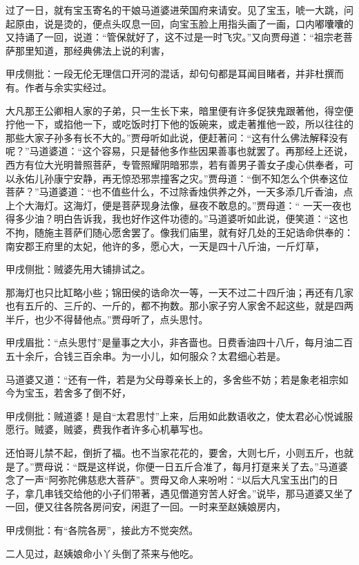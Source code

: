 \begin{parag}
    过了一日，就有宝玉寄名的干娘马道婆进荣国府来请安。见了宝玉，唬一大跳，问起原由，说是烫的，便点头叹息一回，向宝玉脸上用指头画了一画，口内嘟囔囔的又持诵了一回，说道：“管保就好了，这不过是一时飞灾。”又向贾母道：“祖宗老菩萨那里知道，那经典佛法上说的利害，\begin{note}甲戌侧批：一段无伦无理信口开河的混话，却句句都是耳闻目睹者，并非杜撰而有。作者与余实实经过。\end{note}大凡那王公卿相人家的子弟，只一生长下来，暗里便有许多促狭鬼跟著他，得空便拧他一下，或掐他一下，或吃饭时打下他的饭碗来，或走著推他一跤，所以往往的那些大家子孙多有长不大的。”贾母听如此说，便赶著问：“这有什么佛法解释没有呢？”马道婆道：“这个容易，只是替他多作些因果善事也就罢了。再那经上还说，西方有位大光明普照菩萨，专管照耀阴暗邪祟，若有善男子善女子虔心供奉者，可以永佑儿孙康宁安静，再无惊恐邪祟撞客之灾。”贾母道：“倒不知怎么个供奉这位菩萨？”马道婆道：“也不值些什么，不过除香烛供养之外，一天多添几斤香油，点上个大海灯。这海灯，便是菩萨现身法像，昼夜不敢息的。”贾母道：“ 一天一夜也得多少油？明白告诉我，我也好作这件功德的。”马道婆听如此说，便笑道：“这也不拘，随施主菩萨们随心愿舍罢了。像我们庙里，就有好几处的王妃诰命供奉的：南安郡王府里的太妃，他许的多，愿心大，一天是四十八斤油，一斤灯草，\begin{note}甲戌侧批：贼婆先用大铺排试之。\end{note}那海灯也只比缸略小些；锦田侯的诰命次一等，一天不过二十四斤油；再还有几家也有五斤的、三斤的、一斤的，都不拘数。那小家子穷人家舍不起这些，就是四两半斤，也少不得替他点。”贾母听了，点头思忖。\begin{note}甲戌眉批：“点头思忖”是量事之大小，非吝啬也。日费香油四十八斤，每月油二百五十余斤，合钱三百余串。为一小儿，如何服众？太君细心若是。\end{note}马道婆又道：“还有一件，若是为父母尊亲长上的，多舍些不妨；若是象老祖宗如今为宝玉，若舍多了倒不好，\begin{note}甲戌侧批：贼道婆！是自“太君思忖”上来，后用如此数语收之，使太君必心悦诚服愿行。贼婆，贼婆，费我作者许多心机摹写也。\end{note}还怕哥儿禁不起，倒折了福。也不当家花花的，要舍，大则七斤，小则五斤，也就是了。”贾母说：“既是这样说，你便一日五斤合准了，每月打趸来关了去。”马道婆念了一声“阿弥陀佛慈悲大菩萨”。贾母又命人来吩咐：“以后大凡宝玉出门的日子，拿几串钱交给他的小子们带著，遇见僧道穷苦人好舍。”说毕，那马道婆又坐了一回，便又往各院各房问安，闲逛了一回。一时来至赵姨娘房内，\begin{note}甲戌侧批：有“各院各房”，接此方不觉突然。\end{note}二人见过，赵姨娘命小丫头倒了茶来与他吃。
\end{parag}


